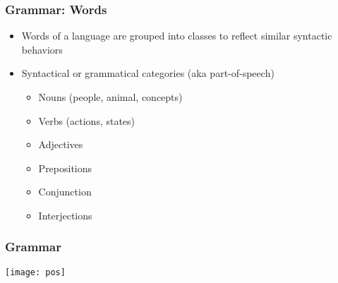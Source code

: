 



\begin{frame}[fragile]
  \frametitle{Grammar: Words}
  \begin{itemize}
  \item Words of a language are grouped into classes to reflect similar syntactic behaviors
  \item Syntactical or grammatical categories (aka part-of-speech)
       \begin{itemize}
	  \item Nouns (people, animal, concepts)
	  \item Verbs (actions, states)
	  \item Adjectives
	  \item Prepositions
	  \item Conjunction
	  \item Interjections
	  \end{itemize}
  \end{itemize}
\end{frame}

\begin{frame}[fragile]
  \frametitle{Grammar}
  \begin{center}
\texttt{[image: pos]}
\end{center}
\end{frame}



